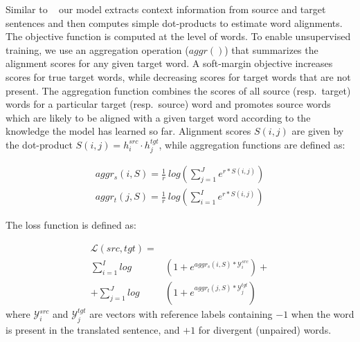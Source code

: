\documentclass[11pt,a4paper]{article}
\begin{document}

Similar to ~\cite{W16-2207} our model extracts context information from source and target sentences and then computes simple dot-products to estimate word alignments. The objective function is computed at the level of words. 
To enable unsupervised training, we use an aggregation operation
($aggr()$) that summarizes the alignment scores for any given target word. 
A soft-margin objective increases scores for true target words, while decreasing scores for target words that are not present.
The aggregation function combines the scores of all source (resp.\ target) words for a particular target (resp.\ source) word and promotes source words which are likely to be aligned with a given target word according to the knowledge the model has learned so far.
Alignment scores $S(i,j)$ are given by the dot-product $S(i,j) = h_i^{src} \cdotp h_j^{tgt}$, while aggregation functions are defined as:

\begin{equation}
\begin{split}
    aggr_s(i,S) = \frac{1}{r} \ log \left( \displaystyle \sum_{j=1}^{J} e^{r * S(i,j)}\right) \\
    aggr_t(j,S) = \frac{1}{r} \ log \left( \displaystyle \sum_{i=1}^{I} e^{r * S(i,j)}\right)
\end{split}
\label{aggregation}
\end{equation}

The loss function is defined as:

\begin{equation}
\begin{split}
\mathcal{L}(src,tgt) = & \\
    \sum_{i=1}^I log&\left(1+e^{aggr_{s}(i,S) * \mathcal{Y}_i^{src}}\right) +\\
 + \sum_{j=1}^J log&\left(1+e^{aggr_{t}(j,S) * \mathcal{Y}_j^{tgt}}\right)
\end{split}
\label{loss_wemb}
\end{equation}
\noindent where $\mathcal{Y}_i^{src}$ and $\mathcal{Y}_j^{tgt}$ are vectors with reference labels containing $-1$ when the word is present in the translated sentence, and $+1$ for divergent (unpaired) words. 
\end{document}
